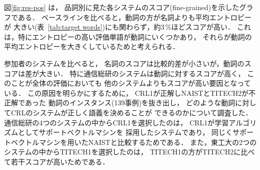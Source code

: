 図\ref{fig:res-pos} は，
品詞別に見た各システムのスコア(fine-grained)を示したグラフである．
ベースラインを比べると，動詞の方が名詞よりも平均エントロピーが
大きい(表~\ref{tab:target words})にも関わらず，約3\,\%ほどスコアが高い．
これは，特にエントロピーの高い評価単語が動詞にいくつかあり，
それらが動詞の平均エントロピーを大きくしているためと考えられる．

参加者のシステムを比べると，
名詞のスコアは比較的差が小さいが，動詞のスコアは差が大きい．
特に通信総研のシステムは動詞に対するスコアが高く，
このことが全体の評価においても
他のシステムよりもスコアが高い要因となっている．
この原因を明らかにするために，
CRL1が正解しNAISTとTITECH2が不正解であった
動詞のインスタンス(139事例)を抜き出し，
どのような動詞に対してCRLのシステムが正しく語義を決めることが
できるのかについて調査した．
通信総研の4つのシステムの中からCRL1を選択したのは，
CRL1が学習アルゴリズムとしてサポートベクトルマシンを
採用したシステムであり，
同じくサポートベクトルマシンを用いたNAISTと比較するためである．
また，東工大の2つのシステムの中からTITECH1を選択したのは，
TITECH1の方がTITECH2に比べて若干スコアが高いためである．

